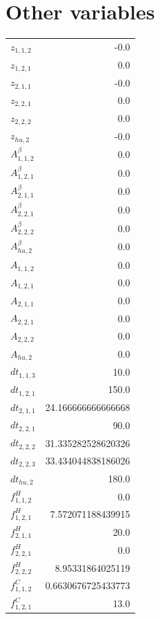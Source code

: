 \documentclass{article}%
\makeatletter
\let\mcnewpage=\newpage%
\newcommand{\TrickSupertabularIntoMulticols}{%
\renewcommand\newpage{%
\if@firstcolumn%
\hrule width\linewidth height0pt%
\columnbreak%
\else%
\mcnewpage%
\fi%
}%
}%
\makeatother
\begin{document}
\section{Other variables}%
\thispagestyle{plain}%
\begin{multicols*}{3}%
\TrickSupertabularIntoMulticols%
%
\begin{supertabular}{lr}%
	$z_{1,1,2}$ & -0.0 \\%
	$z_{1,2,1}$ & 0.0 \\%
	$z_{2,1,1}$ & -0.0 \\%
	$z_{2,2,1}$ & 0.0 \\%
	$z_{2,2,2}$ & 0.0 \\%
	$z_{hu,2}$ & -0.0 \\%
	$A_{1,1,2}^{\beta}$ & 0.0 \\%
	$A_{1,2,1}^{\beta}$ & 0.0 \\%
	$A_{2,1,1}^{\beta}$ & 0.0 \\%
	$A_{2,2,1}^{\beta}$ & 0.0 \\%
	$A_{2,2,2}^{\beta}$ & 0.0 \\%
	$A_{hu,2}^{\beta}$ & 0.0 \\%
	$A_{1,1,2}$ & 0.0 \\%
	$A_{1,2,1}$ & 0.0 \\%
	$A_{2,1,1}$ & 0.0 \\%
	$A_{2,2,1}$ & 0.0 \\%
	$A_{2,2,2}$ & 0.0 \\%
	$A_{hu,2}$ & 0.0 \\%
	$dt_{1,1,3}$ & 10.0 \\%
	$dt_{1,2,1}$ & 150.0 \\%
	$dt_{2,1,1}$ & 24.166666666666668 \\%
	$dt_{2,2,1}$ & 90.0 \\%
	$dt_{2,2,2}$ & 31.335282528620326 \\%
	$dt_{2,2,3}$ & 33.434044838186026 \\%
	$dt_{hu,2}$ & 180.0 \\%
	$f_{1,1,2}^{H}$ & 0.0 \\%
	$f_{1,2,1}^{H}$ & 7.572071188439915 \\%
	$f_{2,1,1}^{H}$ & 20.0 \\%
	$f_{2,2,1}^{H}$ & 0.0 \\%
	$f_{2,2,2}^{H}$ & 8.95331864025119 \\%
	$f_{1,1,2}^{C}$ & 0.6630676725433773 \\%
	$f_{1,2,1}^{C}$ & 13.0 \\%

\end{supertabular}
\end{multicols*}
\end{document}
